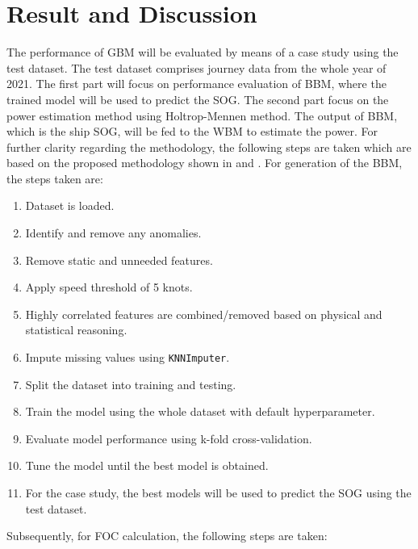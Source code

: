\chapter{Result and Discussion} \label{chp:result_and_discussion}

The performance of GBM will be evaluated by means of a case study using the test dataset. The test dataset comprises journey data from the whole year of 2021. The first part will focus on performance evaluation of BBM, where the trained model will be used to predict the SOG. The second part focus on the power estimation method using Holtrop-Mennen method. The output of BBM, which is the ship SOG, will be fed to the WBM to estimate the power. For further clarity regarding the methodology, the following steps are taken which are based on the proposed methodology shown in  and . For generation of the BBM, the steps taken are:

\begin{enumerate}
    \setlength\itemsep{0em}
    \item Dataset is loaded.
    \item Identify and remove any anomalies.
    \item Remove static and unneeded features.
    \item Apply speed threshold of 5 knots.
    \item Highly correlated features are combined/removed based on physical and statistical reasoning.
    \item Impute missing values using {\tt KNNImputer}.
    \item Split the dataset into training and testing.
    \item Train the model using the whole dataset with default hyperparameter.
    \item Evaluate model performance using k-fold cross-validation.
    \item Tune the model until the best model is obtained.
    \item For the case study, the best models will be used to predict the SOG using the test dataset.
\end{enumerate}

Subsequently, for FOC calculation, the following steps are taken:

